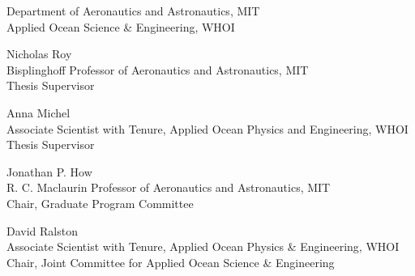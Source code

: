 \begin{titlepage}
\begin{center}
\begin{singlespace}
    \signature{Author}{\footnotesize Department of Aeronautics and Astronautics, MIT \\ Applied Ocean Science \& Engineering, WHOI \\ \@date}
    \vspace{1em}
    \signature{Certified by}{Nicholas Roy \\ \footnotesize Bisplinghoff Professor of Aeronautics and Astronautics, MIT \\ Thesis Supervisor}
    \vspace{1em}
    \signature{Certified by}{Anna Michel \\ \footnotesize Associate Scientist with Tenure, Applied Ocean Physics and Engineering, WHOI \\ Thesis Supervisor}
    \vspace{1em}
    \signature{Accepted by}{Jonathan P. How \\ \footnotesize R. C. Maclaurin Professor of Aeronautics and Astronautics, MIT \\ Chair, Graduate Program Committee}
    \vspace{1em}
    \signature{Accepted by}{David Ralston \\ \footnotesize Associate Scientist with Tenure, Applied Ocean Physics \& Engineering, WHOI \\ Chair, Joint Committee for Applied Ocean Science \& Engineering}
    \end{singlespace}
  \end{center}
  \makeatother
\end{titlepage}

\newpage
\null
\thispagestyle{empty}
\newpage